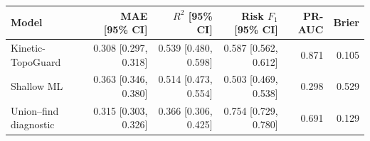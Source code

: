 \begin{tabular}{lrrrrr}
\toprule
Model & MAE [95\% CI] & $R^2$ [95\% CI] & Risk $F_1$ [95\% CI] & PR-AUC & Brier \\
\midrule
Kinetic-TopoGuard & 0.308 [0.297, 0.318] & 0.539 [0.480, 0.598] & 0.587 [0.562, 0.612] & 0.871 & 0.105 \\
Shallow ML & 0.363 [0.346, 0.380] & 0.514 [0.473, 0.554] & 0.503 [0.469, 0.538] & 0.298 & 0.529 \\
Union--find diagnostic & 0.315 [0.303, 0.326] & 0.366 [0.306, 0.425] & 0.754 [0.729, 0.780] & 0.691 & 0.129 \\
\bottomrule
\end{tabular}